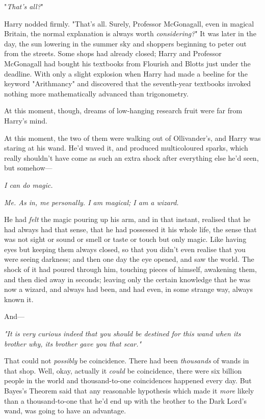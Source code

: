 "\emph{That's all?}"

Harry nodded firmly. "That's all. Surely, Professor McGonagall, even in magical 
Britain, the normal explanation is always worth \emph{considering?}"
\sbreak
It was later in the day, the sun lowering in the summer sky and shoppers 
beginning to peter out from the streets. Some shops had already closed; Harry 
and Professor McGonagall had bought his textbooks from Flourish and Blotts just 
under the deadline. With only a slight explosion when Harry had made a beeline 
for the keyword "Arithmancy" and discovered that the seventh-year textbooks 
invoked nothing more mathematically advanced than trigonometry.

At this moment, though, dreams of low-hanging research fruit were far from 
Harry's mind.

At this moment, the two of them were walking out of Ollivander's, and Harry was 
staring at his wand. He'd waved it, and produced multicoloured sparks, which 
really shouldn't have come as such an extra shock after everything else he'd 
seen, but somehow---

\emph{I can do magic.}

\emph{Me. As in, me personally. I am magical; I am a wizard.}

He had \emph{felt} the magic pouring up his arm, and in that instant, realised 
that he had always had that sense, that he had possessed it his whole life, the 
sense that was not sight or sound or smell or taste or touch but only magic. 
Like having eyes but keeping them always closed, so that you didn't even 
realise that you were seeing darkness; and then one day the eye opened, and saw 
the world. The shock of it had poured through him, touching pieces of himself, 
awakening them, and then died away in seconds; leaving only the certain 
knowledge that he was now a wizard, and always had been, and had even, in some 
strange way, always known it.

And---

\emph{"It is very curious indeed that you should be destined for this wand when 
its brother why, its brother gave you that scar."}

That could not \emph{possibly} be coincidence. There had been \emph{thousands} 
of wands in that shop. Well, okay, actually it \emph{could} be coincidence, 
there were six billion people in the world and thousand-to-one coincidences 
happened every day. But Bayes's Theorem said that any reasonable hypothesis 
which made it \emph{more} likely than a thousand-to-one that he'd end up with 
the brother to the Dark Lord's wand, was going to have an advantage.

